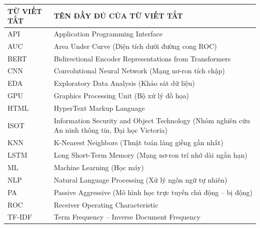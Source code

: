 
\begin{table}[H]
\centering
\begin{tabular}{|p{4.5cm}|p{9.5cm}|}
\hline
\centering\textbf{TỪ VIẾT TẮT} & \centering\arraybackslash\textbf{TÊN ĐẦY ĐỦ CỦA TỪ VIẾT TẮT} \\
\hline
API & Application Programming Interface \\
\hline
AUC & Area Under Curve (Diện tích dưới đường cong ROC) \\
\hline
BERT & Bidirectional Encoder Representations from Transformers \\
\hline
CNN & Convolutional Neural Network (Mạng nơ-ron tích chập) \\
\hline
EDA & Exploratory Data Analysis (Khảo sát dữ liệu) \\
\hline
GPU & Graphics Processing Unit (Bộ xử lý đồ họa) \\
\hline
HTML & HyperText Markup Language \\
\hline
ISOT & Information Security and Object Technology (Nhóm nghiên cứu An ninh thông tin, Đại học Victoria) \\
\hline
KNN & K-Nearest Neighbors (Thuật toán láng giềng gần nhất) \\
\hline
LSTM & Long Short-Term Memory (Mạng nơ-ron trí nhớ dài ngắn hạn) \\
\hline
ML & Machine Learning (Học máy) \\
\hline
NLP & Natural Language Processing (Xử lý ngôn ngữ tự nhiên) \\
\hline
PA & Passive Aggressive (Mô hình học trực tuyến chủ động -- bị động) \\
\hline
ROC & Receiver Operating Characteristic \\
\hline
TF-IDF & Term Frequency -- Inverse Document Frequency \\
\hline
\end{tabular}
\end{table}
